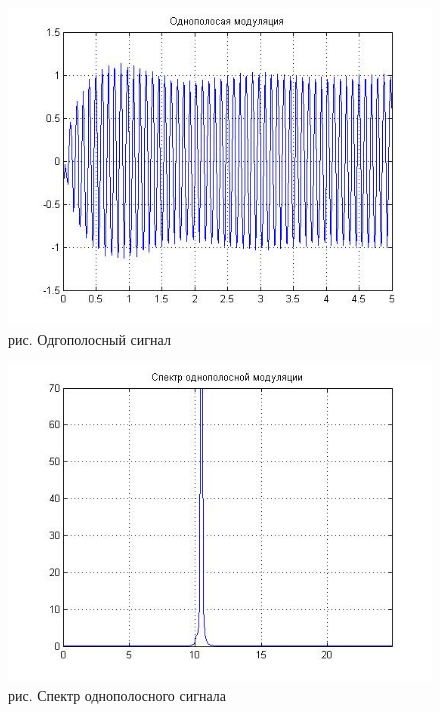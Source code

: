 \documentclass[10pt,a4paper]{report}
\begin{document}
\begin{figure}
\begin{center}
\includegraphics[angle=0, scale = 0.9]{7_7.jpg}\newline
рис. Одгополосный сигнал\newline
\end{center}
\end{figure}
\begin{figure}
\begin{center}
\includegraphics[angle=0, scale = 0.9]{7_8.jpg}\newline
рис. Спектр однополосного сигнала\newline
\end{center}
\end{figure}
\end{document}
